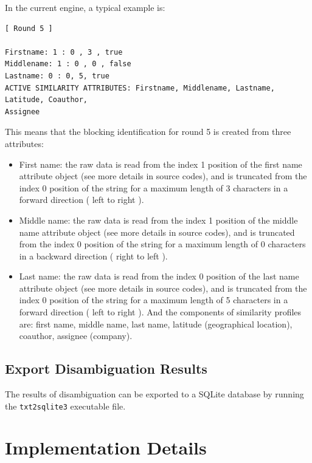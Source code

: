 \documentclass{article}
\begin{document}
In the current engine, a typical example is:

\begin{verbatim}
[ Round 5 ]

Firstname: 1 : 0 , 3 , true
Middlename: 1 : 0 , 0 , false
Lastname: 0 : 0, 5, true
ACTIVE SIMILARITY ATTRIBUTES: Firstname, Middlename, Lastname, Latitude, Coauthor,
Assignee
\end{verbatim}


This means that the blocking identification for round 5 is
created from three attributes:

\begin{itemize}

\item First name: the raw data is read from the index 1 position
of the first name attribute object (see more details in source codes),
and is truncated from the index 0 position of the string for a
maximum length of 3 characters in a forward direction ( left to right ).

\item Middle name: the raw data is read from the index 1 position
of the middle name attribute object (see more details in source codes),
and is truncated from the index 0 position of the string for a
maximum length of 0 characters in a backward direction ( right to left ).

\item Last name: the raw data is read from the index 0 position of
the last name attribute object (see more details in source codes),
and is truncated from the index 0 position of the string for a
maximum length of 5 characters in a forward direction ( left to right ).
And the components of similarity profiles are: first name, middle name,
last name, latitude (geographical location), coauthor, assignee (company).

\end{itemize}

\subsection{Export Disambiguation Results}

The results of disambiguation can be exported to a
SQLite database by running the \texttt{txt2sqlite3}
executable file.



\section{Implementation Details}
\end{document}
